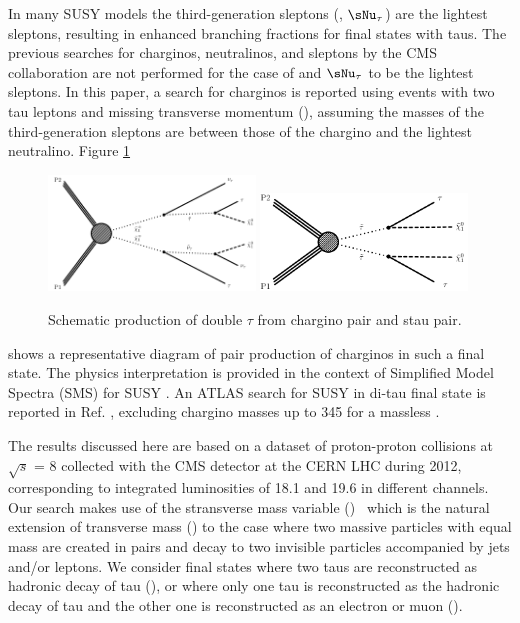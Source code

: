 In many SUSY models \cite{Martin:1997ns} the third-generation sleptons (\sTau, $\sNu_\tau$) are the lightest sleptons, 
resulting in enhanced branching fractions for final states with taus. The previous searches for charginos, neutralinos, 
and sleptons by the CMS collaboration \cite{Khachatryan:2014qwa} are not performed for the case of \stau and $\sNu_\tau$
to be the lightest sleptons. In this paper, a search for charginos is reported using events with two tau leptons and 
missing transverse momentum (\MPT), assuming the masses of the third-generation sleptons are between those of the 
chargino and the lightest neutralino.
Figure \ref{fig:Productions} 
\begin{figure}[!Hhtb]
\centering
\includegraphics[width=0.49\textwidth]{Introductionfigs/TChipmSlepSnu.pdf}
\includegraphics[width=0.49\textwidth]{Introductionfigs/TSlepSlep.pdf}
\caption{Schematic production of double $\tau$ from chargino pair and stau pair.}
\label{fig:Productions}
\end{figure}
shows a representative diagram of pair production of charginos in such a final state. 
The physics interpretation is provided in the context of Simplified Model Spectra (SMS) for SUSY \cite{Alwall:2008ag,alves:sms}.
An ATLAS search for SUSY in di-tau final state is reported in Ref. \cite{Aad:2014yka}, excluding chargino masses up to 345 \GeV 
for a massless \PSGczDo.

The results discussed here are based on a dataset of proton-proton 
collisions at $\sqrt{s}$ = 8\TeV
collected with the CMS detector at the CERN LHC during 2012, corresponding to integrated
luminosities of 18.1 and 19.6 \invfb in different channels. 
Our search makes use of the stransverse mass variable (\mttwo)~\cite{Lester:1999tx,Barr:2003rg}
which is the natural extension of transverse mass (\mt) to the case 
where two massive particles with equal mass are created in pairs and decay 
to two invisible particles accompanied by jets and/or leptons.  We consider final states where
two taus are reconstructed as hadronic decay of tau (\tauTau), or where only one tau is reconstructed as the hadronic decay of tau and the
other one is reconstructed as an electron or muon (\leptonTau).

